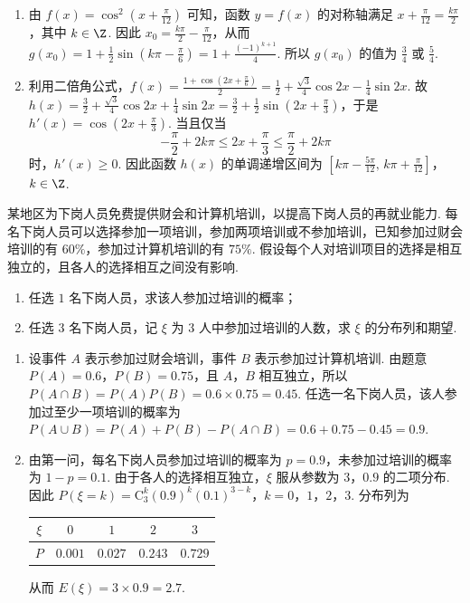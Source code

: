 \begin{solution}
\begin{enumerate}
\item
由 \(f(x)=\cos^2\left(x+\frac{\pi}{12}\right)\) 可知，函数 \(y=f(x)\) 的对称轴满足 \(x+\frac{\pi}{12}=\frac{k\pi}{2}\)，其中 \(k\in\Z\). 因此 \(x_0=\frac{k\pi}{2}-\frac{\pi}{12}\)，从而
\(g(x_0)=1+\frac{1}{2}\sin\left(k\pi-\frac{\pi}{6}\right)=1+\frac{(-1)^{k+1}}{4}\).
所以 \(g(x_0)\) 的值为 \(\frac{3}{4}\) 或 \(\frac{5}{4}\).

\item
利用二倍角公式，\(f(x)=\frac{1+\cos\left(2x+\frac{\pi}{6}\right)}{2}=\frac{1}{2}+\frac{\sqrt{3}}{4}\cos 2x-\frac{1}{4}\sin 2x\). 故 \(h(x)=\frac{3}{2}+\frac{\sqrt{3}}{4}\cos 2x+\frac{1}{4}\sin 2x=\frac{3}{2}+\frac{1}{2}\sin\left(2x+\frac{\pi}{3}\right)\)，于是 \(h'(x)=\cos\left(2x+\frac{\pi}{3}\right)\).
当且仅当
\[
-\frac{\pi}{2}+2k\pi\leqslant2x+\frac{\pi}{3}\leqslant\frac{\pi}{2}+2k\pi
\]
时，\(h'(x)\geqslant0\). 因此函数 \(h(x)\) 的单调递增区间为
\(\left[k\pi-\frac{5\pi}{12},\,k\pi+\frac{\pi}{12}\right]\)，\(k\in\Z\).
\end{enumerate}
\end{solution}

\begin{problem}
某地区为下岗人员免费提供财会和计算机培训，以提高下岗人员的再就业能力. 每名下岗人员可以选择参加一项培训，参加两项培训或不参加培训，已知参加过财会培训的有 \(60\%\)，参加过计算机培训的有 \(75\%\). 假设每个人对培训项目的选择是相互独立的，且各人的选择相互之间没有影响.

\begin{enumerate}
\item 任选 \(1\) 名下岗人员，求该人参加过培训的概率；
\item 任选 \(3\) 名下岗人员，记 \(\xi\) 为 \(3\) 人中参加过培训的人数，求 \(\xi\) 的分布列和期望.
\end{enumerate}
\end{problem}

\begin{solution}
\begin{enumerate}
\item
设事件 \(A\) 表示参加过财会培训，事件 \(B\) 表示参加过计算机培训. 由题意 \(P(A)=0.6\)，\(P(B)=0.75\)，且 \(A\)，\(B\) 相互独立，所以 \(P(A\cap B)=P(A)P(B)=0.6\times0.75=0.45\). 任选一名下岗人员，该人参加过至少一项培训的概率为 \(P(A\cup B)=P(A)+P(B)-P(A\cap B)=0.6+0.75-0.45=0.9\).

\item
由第一问，每名下岗人员参加过培训的概率为 \(p=0.9\)，未参加过培训的概率为 \(1-p=0.1\). 由于各人的选择相互独立，\(\xi\) 服从参数为 \(3\)，\(0.9\) 的二项分布. 因此
\(P(\xi=k)=\mathrm C_3^k(0.9)^k(0.1)^{3-k}\)，\(k=0\)，\(1\)，\(2\)，\(3\).
分布列为
\begin{center}
\begin{tabular}{c|cccc}
\(\xi\)&\(0\)&\(1\)&\(2\)&\(3\)\\ \hline
\(P\)&\(0.001\)&\(0.027\)&\(0.243\)&\(0.729\)
\end{tabular}
\end{center}
从而
\(E(\xi)=3\times0.9=2.7\).
\end{enumerate}
\end{solution}


